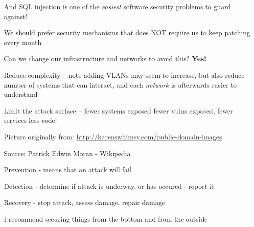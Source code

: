 \documentclass[Screen16to9,17pt]{foils}
\begin{document}
\begin{list2}
\item And SQL injection is one of the \emph{easiest} software security problems to guard against!
\end{list2}






\begin{list2}
\item We should prefer security mechanisms that does NOT require us to keep patching every month
\item Can we change our infrastructure and networks to avoid this? {\bf Yes!}
\item Reduce complexity -- note adding VLANs may seem to increase, but also reduce number of systems that can interact, and each \emph{network} is afterwards easier to understand
\item Limit the attack surface -- fewer systems exposed \faArrowRight fewer vulns exposed, fewer services \faArrowRight  less code!
\end{list2}



\centerline{Picture originally from: \url{http://karenswhimsy.com/public-domain-images}}





{\footnotesize Source: Patrick Edwin Moran - Wikipedia }

\begin{list2}
\item Prevention - means that an attack will fail
\item Detection - determine if attack is underway, or has occured - report it
\item Recovery - stop attack, assess damage, repair damage
\end{list2}



\centerline{I recommend securing things from the bottom and from the outside}
\end{document}
